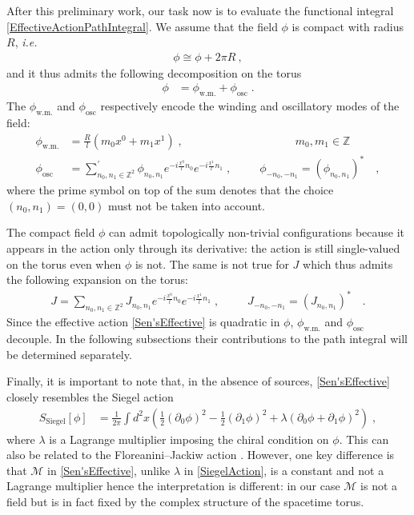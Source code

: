 \documentclass[11pt]{article}
\numberwithin{equation}{section}
\begin{document}
After this preliminary work, our task now is to evaluate the functional integral \eqref{EffectiveActionPathIntegral}.
We assume that the field $\phi$ is compact with radius $R$, {\it i.e.}
\begin{align}
\phi\cong\phi+2\pi R\ ,
\end{align}
 and it thus admits the following decomposition on the torus
\begin{align}
\phi&= \phi_{\text{w.m.}}+\phi_{\text{osc}}\;.
\end{align}
The $\phi_{\text{w.m.}}$ and $\phi_{\text{osc}}$ respectively encode the winding and oscillatory modes of the field:
\begin{align}
\phi_{\text{w.m.}}&=\frac{R}{l}(m_0x^0+m_1x^1)\;,\qquad\qquad\qquad\qquad\qquad m_0,m_1\in\mathbb{Z}\\
\phi_{\text{osc}}&=\sum^\prime_{n_0,n_1\in\mathbb{Z}^2}\phi_{n_0,n_1}e^{-i\frac{x^0}{l}n_0}e^{-i\frac{x^1}{l}n_1}\;, \qquad\,\,\, \phi_{-n_0,-n_1}=(\phi_{n_0,n_1})^*\quad,
\end{align} 
where the prime symbol on top of the sum denotes that the choice $(n_0,n_1)=(0,0)$ must not be taken into account.

The compact field $\phi$ can admit topologically non-trivial configurations because it appears in the action only through its derivative: the action is still single-valued on the torus even when $\phi$ is not. The same is not true for $J$ which thus admits the following expansion on the torus:
\begin{align}
J=\sum_{n_0,n_1\in\mathbb{Z}^2}J_{n_0,n_1}e^{-i\frac{x^0}{l}n_0}e^{-i\frac{x^1}{l}n_1}\;, \qquad\,\,\, J_{-n_0,-n_1}=(J_{n_0,n_1})^*\quad.
\end{align}
Since the effective action \eqref{Sen'sEffective} is quadratic in $\phi$, $\phi_{\text{w.m.}}$ and $\phi_{\text{osc}}$ decouple. In the following subsections their contributions to the path integral will be determined separately. 

Finally, it is important to note that, in the absence of sources, \eqref{Sen'sEffective} closely resembles the Siegel action \cite{Siegel:1983es}
\begin{align}\label{SiegelAction}
S_{\text{Siegel}}[\phi]&=\frac1{2\pi}\int d^2 x \left(\frac12(\partial_0\phi)^2-\frac12(\partial_1\phi)^2+\lambda\left(\partial_0\phi+\partial_1\phi\right)^2\right)\;,
\end{align}
where $\lambda$ is a Lagrange multiplier imposing the chiral condition on $\phi$. This can also be related to the Floreanini--Jackiw action \cite{Floreanini:1987as,Bernstein:1988zd}. However, one key difference is that ${\mathcal M}$ in \eqref{Sen'sEffective}, unlike $\lambda$ in \eqref{SiegelAction}, is a constant and not a Lagrange multiplier hence the interpretation is different: in our case ${\mathcal M}$ is not a field but is in fact fixed by the complex structure of the spacetime torus. 
 
\end{document}
